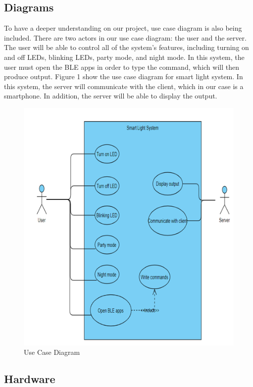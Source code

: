 \subsection{Diagrams}
To have a deeper understanding on our project, use case diagram is also being included. There are two actors in our use case diagram: the user and the server. The user will be able to control all of the system's features, including turning on and off LEDs, blinking LEDs, party mode, and night mode. In this system, the user must open the BLE apps in order to type the command, which will then produce output. Figure 1 show the use case diagram for smart light system. In this system, the server will communicate with the client, which in our case is a smartphone. In addition, the server will be able to display the output.


\begin{figure}[htp]
    \centering
    \includegraphics{imageusecase.png}
    \caption{Use Case Diagram}
    \label{bulat1}
\end{figure}



\subsection{Hardware}

